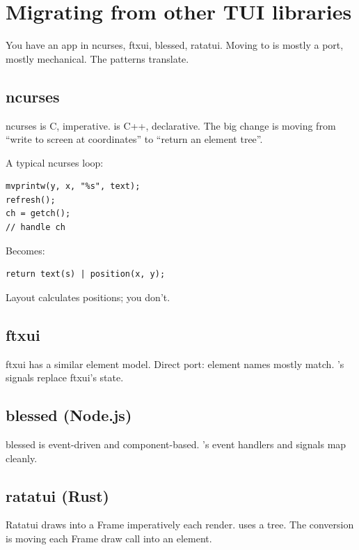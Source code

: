 \chapter{Migrating from other TUI libraries}
\label{ch:migrating}

\begin{aside}
You have an app in ncurses, ftxui, blessed, ratatui. Moving
to \maya{} is mostly a port, mostly mechanical. The patterns
translate.
\end{aside}

\section{ncurses}

ncurses is C, imperative. \maya{} is C++, declarative. The
big change is moving from ``write to screen at coordinates''
to ``return an element tree''.

A typical ncurses loop:

\begin{lstlisting}
mvprintw(y, x, "%s", text);
refresh();
ch = getch();
// handle ch
\end{lstlisting}

Becomes:

\begin{lstlisting}
return text(s) | position(x, y);
\end{lstlisting}

Layout calculates positions; you don't.

\section{ftxui}

ftxui has a similar element model. Direct port: element
names mostly match. \maya{}'s signals replace ftxui's
 state.

\section{blessed (Node.js)}

blessed is event-driven and component-based. \maya{}'s
event handlers and signals map cleanly.

\section{ratatui (Rust)}

Ratatui draws into a Frame imperatively each render. \maya{}
uses a tree. The conversion is moving each Frame draw call
into an element.

